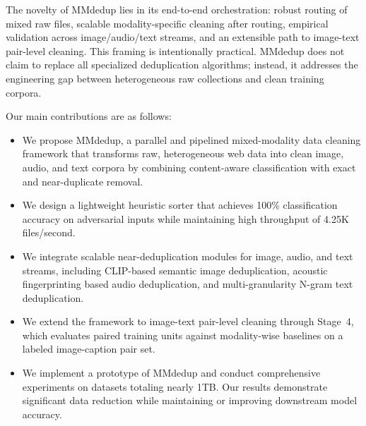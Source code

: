 \documentclass[conference]{IEEEtran}
\begin{document}
The novelty of MMdedup lies in its end-to-end orchestration: robust routing of mixed raw files, scalable modality-specific cleaning after routing, empirical validation across image/audio/text streams, and an extensible path to image-text pair-level cleaning. This framing is intentionally practical. MMdedup does not claim to replace all specialized deduplication algorithms; instead, it addresses the engineering gap between heterogeneous raw collections and clean training corpora.

Our main contributions are as follows:

\begin{itemize}

    \item We propose MMdedup, a parallel and pipelined mixed-modality data cleaning framework that transforms raw, heterogeneous web data into clean image, audio, and text corpora by combining content-aware classification with exact and near-duplicate removal.
    
    \item We design a lightweight heuristic sorter that achieves 100\% classification accuracy on adversarial inputs while maintaining high throughput of 4.25K files/second.
    \item We integrate scalable near-deduplication modules for image, audio, and text streams, including CLIP-based semantic image deduplication, acoustic fingerprinting based audio deduplication, and multi-granularity N-gram text deduplication.
    
    \item We extend the framework to image-text pair-level cleaning through Stage~4, which evaluates paired training units against modality-wise baselines on a labeled image-caption pair set.
    
    \item We implement a prototype of MMdedup and conduct comprehensive experiments on datasets totaling nearly 1TB. Our results demonstrate significant data reduction while maintaining or improving downstream model accuracy.
\end{itemize}


\end{document}
